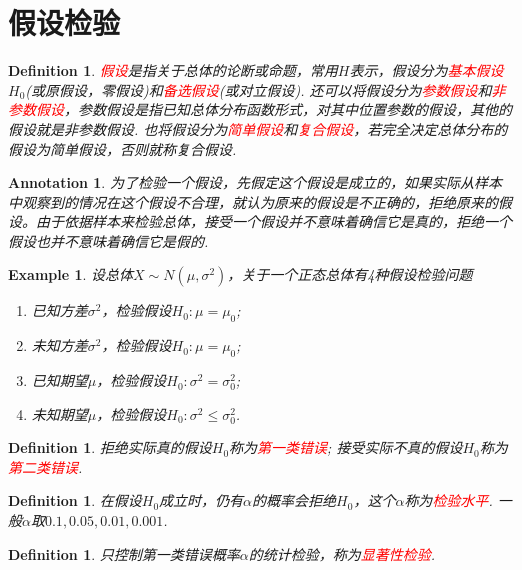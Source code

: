\documentclass{article}
\newtheorem{example}[theorem]{Example}
\newtheorem{definition}[theorem]{Definition}
\newtheorem{annotation}[theorem]{Annotation}
\newcommand{\redt}[1]{\textcolor{red}{#1}}
\begin{document}
\newpage
 \section{假设检验}

\begin{definition}
\rm \redt{假设}是指关于总体的论断或命题，常用$H$表示，假设分为\redt{基本假设}$H_0$(或原假设，零假设)和\redt{备选假设}(或对立假设). 还可以将假设分为\redt{参数假设}和\redt{非参数假设}，参数假设是指已知总体分布函数形式，对其中位置参数的假设，其他的假设就是非参数假设. 也将假设分为\redt{简单假设}和\redt{复合假设}，若完全决定总体分布的假设为简单假设，否则就称复合假设.
\end{definition}

\begin{annotation}
\rm 为了检验一个假设，先假定这个假设是成立的，如果实际从样本中观察到的情况在这个假设不合理，就认为原来的假设是不正确的，拒绝原来的假设。由于依据样本来检验总体，接受一个假设并不意味着确信它是真的，拒绝一个假设也并不意味着确信它是假的. 
\end{annotation}

\begin{example}
\rm 设总体$X \sim N(\mu,\sigma^2)$，关于一个正态总体有4种假设检验问题
\begin{enumerate}
	\item 已知方差$\sigma^2$，检验假设$H_0: \mu = \mu_0$;
	\item 未知方差$\sigma^2$，检验假设$H_0: \mu = \mu_0$;
	\item 已知期望$\mu$，检验假设$H_0: \sigma^2 = \sigma_0^2$;
	\item 未知期望$\mu$，检验假设$H_0: \sigma^2 \leq \sigma_0^2$.
\end{enumerate}
\end{example}

\begin{definition}
\rm 拒绝实际真的假设$H_0$称为\redt{第一类错误}; 接受实际不真的假设$H_0$称为\redt{第二类错误}.
\end{definition}

\begin{definition}
\rm 在假设$H_0$成立时，仍有$\alpha$的概率会拒绝$H_0$，这个$\alpha$称为\redt{检验水平}. 一般$\alpha$取$0.1,0.05,0.01,0.001$. 
\end{definition}

\begin{definition}
\rm 只控制第一类错误概率$\alpha$的统计检验，称为\redt{显著性检验}.
\end{definition}
\end{document}
